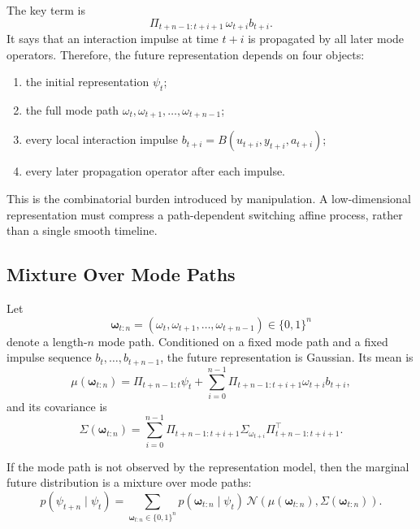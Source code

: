 The key term is
\begin{equation}
\Pi_{t+n-1:t+i+1}\,
\omega_{t+i}b_{t+i}.
\end{equation}
It says that an interaction impulse at time \(t+i\) is propagated by all later mode operators. Therefore, the future representation depends on four objects:
\begin{enumerate}
    \item the initial representation \(\psi_t\);
    \item the full mode path \(\omega_t,\omega_{t+1},\ldots,\omega_{t+n-1}\);
    \item every local interaction impulse \(b_{t+i}=B(u_{t+i},y_{t+i},a_{t+i})\);
    \item every later propagation operator after each impulse.
\end{enumerate}

This is the combinatorial burden introduced by manipulation. A low-dimensional representation must compress a path-dependent switching affine process, rather than a single smooth timeline.

\subsection{Mixture Over Mode Paths}

Let
\[
\boldsymbol{\omega}_{t:n}
=
(\omega_t,\omega_{t+1},\ldots,\omega_{t+n-1})
\in\{0,1\}^n
\]
denote a length-\(n\) mode path. Conditioned on a fixed mode path and a fixed impulse sequence \(b_t,\ldots,b_{t+n-1}\), the future representation is Gaussian. Its mean is
\begin{equation}
\mu(\boldsymbol{\omega}_{t:n})
=
\Pi_{t+n-1:t}\psi_t
+
\sum_{i=0}^{n-1}
\Pi_{t+n-1:t+i+1}
\omega_{t+i}b_{t+i},
\end{equation}
and its covariance is
\begin{equation}
\Sigma(\boldsymbol{\omega}_{t:n})
=
\sum_{i=0}^{n-1}
\Pi_{t+n-1:t+i+1}
\Sigma_{\omega_{t+i}}
\Pi_{t+n-1:t+i+1}^{\top}.
\end{equation}

If the mode path is not observed by the representation model, then the marginal future distribution is a mixture over mode paths:
\begin{equation}
p(\psi_{t+n}\mid \psi_t)
=
\sum_{\boldsymbol{\omega}_{t:n}\in\{0,1\}^n}
p(\boldsymbol{\omega}_{t:n}\mid \psi_t)
\,
\mathcal N
\left(
\mu(\boldsymbol{\omega}_{t:n}),
\Sigma(\boldsymbol{\omega}_{t:n})
\right).
\end{equation}

